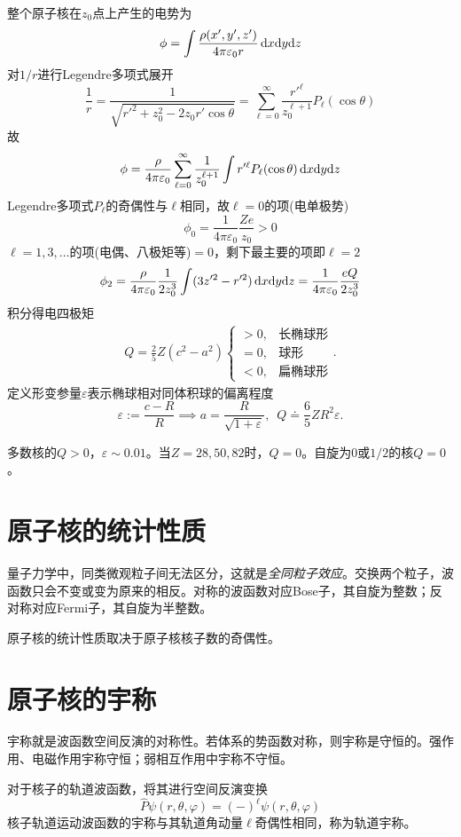 整个原子核在$z_0$点上产生的电势为
\[
	\phi=\int\frac{\rho(x',y',z')}{4\pi\varepsilon_0r}\mathop{}\!\mathrm{d} x\mathrm{d} y\mathrm{d} z
\]
对$1/r$进行Legendre多项式展开
\[
	\frac1r=\frac1{\sqrt{r'^2+z_0^2-2z_0r'\cos\theta}}=\sum_{\ell=0}^\infty \frac{r'^\ell}{z_0^{\ell+1}}P_\ell(\cos\theta)
\]
故
\[
	\phi=\frac\rho{4\pi\varepsilon_0}\sum_{\ell=0}^\infty\frac1{z_0^{\ell+1}}\int r'^\ell P_\ell(\cos\theta)\mathop{}\!\mathrm{d} x\mathrm{d} y\mathrm{d} z
\]
Legendre多项式$P_\ell$的奇偶性与$\ell$相同，故$\ell=0$的项(电单极势)
\[
	\phi_0=\frac1{4\pi\varepsilon_0}\frac{Ze}{z_0}>0
\]
$\ell=1,3,\ldots$的项(电偶、八极矩等)$=0$，剩下最主要的项即$\ell=2$
\[
	\phi_2=\frac\rho{4\pi\varepsilon_0}\frac1{2z_0^3}\int(3z'^2-r'^2)\mathop{}\!\mathrm{d} x\mathrm{d} y\mathrm{d} z=\frac1{4\pi\varepsilon_0}\frac{eQ}{2z_0^3}
\]
积分得电四极矩
\begin{align}
	Q=\frac25Z(c^2-a^2)\begin{cases}
		>0,&\text{长椭球形}\\
		=0,&\text{球形}\\
		<0,&\text{扁椭球形}
	\end{cases}.
\end{align}
定义形变参量$\varepsilon$表示椭球相对同体积球的偏离程度
\[
	\varepsilon:=\frac{c-R}R\implies a=\frac{R}{\sqrt{1+\varepsilon}},\enspace Q\doteq\frac65ZR^2\varepsilon.
\]

多数核的$Q>0$，$\varepsilon\sim 0.01$。当$Z=28,50,82$时，$Q=0$。自旋为0或$1/2$的核$Q=0$。

\section{原子核的统计性质}

量子力学中，同类微观粒子间无法区分，这就是\textit{全同粒子效应}。交换两个粒子，波函数只会不变或变为原来的相反。对称的波函数对应Bose子，其自旋为整数；反对称对应Fermi子，其自旋为半整数。

原子核的统计性质取决于原子核核子数的奇偶性。

\section{原子核的宇称}

宇称就是波函数空间反演的对称性。若体系的势函数对称，则宇称是守恒的。强作用、电磁作用宇称守恒；弱相互作用中宇称不守恒。

对于核子的轨道波函数，将其进行空间反演变换
\[
	\hat P\psi(r,\theta,\varphi)=(-)^\ell\psi(r,\theta,\varphi)
\]
核子轨道运动波函数的宇称与其轨道角动量$\ell$奇偶性相同，称为轨道宇称。

